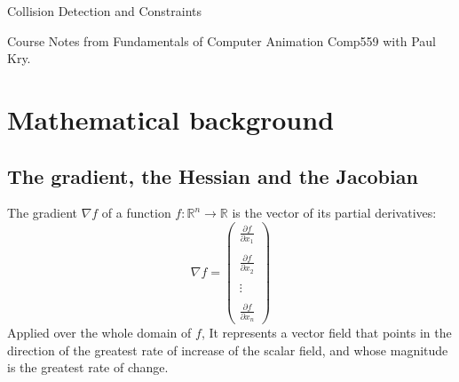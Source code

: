 \documentclass{article}
\begin{document}
\centerline{\sc \large Collision Detection and Constraints}
\centerline{Course Notes from Fundamentals of Computer Animation Comp559 with Paul Kry.}

\section{Mathematical background}
\subsection{The gradient, the Hessian and the Jacobian}
The gradient $\nabla f$ of  a function $ f: \mathbb{R}^n \longrightarrow \mathbb{R} $
is the vector of its partial derivatives:
\[
    \nabla f =
    \begin{pmatrix}
        \frac{\partial f}{\partial x_1} \\ \\
        \frac{\partial f}{\partial x_2} \\ \\
        \vdots \\ \\
        \frac{\partial f}{\partial x_n}
    \end{pmatrix}
\]
Applied over the whole domain of $f$, It represents a vector field that points in the direction of the greatest rate of increase of the scalar field,
and whose magnitude is the greatest rate of change.
\end{document}
